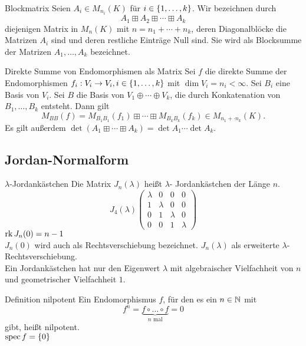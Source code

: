 \documentclass[main.tex]{subfiles}
\begin{document}
\begin{karte}{Blockmatrix}
    Seien \( A_i \in M_{n_i}(K) \) für \( i\in \{1,\ldots,k\} \). 
    Wir bezeichnen durch 
    \[ A_1 \boxplus A_2 \boxplus \cdots \boxplus A_k \] 
    diejenigen Matrix in \( M_n(K) \) mit \( n=n_1 + \cdots + n_k \), 
    deren Diagonalblöcke die Matrizen \( A_i \) sind und deren restliche 
    Einträge Null sind. Sie wird als Blocksumme der Matrizen 
    \( A_1, \ldots, A_k \) bezeichnet.
\end{karte}

\begin{karte}{Direkte Summe von Endomorphismen als Matrix}
    Sei \( f \) die direkte Summe der Endomorphismen 
    \( f_i : V_i \rightarrow V_i, i\in \{1,\ldots, k\} \) 
    mit \( \dim V_i = n_i < \infty \). Sei \( B_i \) 
    eine Basis von \( V_i \). Sei \(B\) die Basis von 
    \( V_1 \oplus \cdots \oplus V_k \), die durch 
    Konkatenation von \( B_1, \ldots, B_k \) entsteht. 
    Dann gilt 
    \[ M_{BB}(f) = M_{B_1B_1}(f_1) \boxplus \cdots \boxplus M_{B_k B_k}(f_k)
    \in M_{ n_1 + \cdot n_k }(K). \]
    Es gilt außerdem \( \det (A_1 \boxplus \cdots \boxplus A_k) = \det A_1 \cdots \det A_k \).
\end{karte}

\subsection*{Jordan-Normalform}

\begin{karte}{\(\lambda\)-Jordankästchen}
    Die Matrix \(J_n(\lambda)\) heißt \(\lambda\)- Jordankästchen der
    Länge \(n\).
    \[J_4(\lambda)\begin{pmatrix}
        \lambda &0 &0 &0\\
        1 &\lambda & 0 &0\\
        0 &1 &\lambda &0\\
        0 &0 &1 &\lambda
    \end{pmatrix}\]
    \(\operatorname{rk} J_n(0) = n-1\)\\
    \(J_n(0)\) wird auch als Rechtsverschiebung bezeichnet. \(J_n(\lambda)\)
    als erweiterte \(\lambda\)-Rechtsverschiebung.\\
    Ein Jordankästchen hat nur den Eigenwert \(\lambda\) mit algebraischer Vielfachheit
    von \(n\) und geometrischer Vielfachheit \(1\).
\end{karte}

\begin{karte}{Definition nilpotent}
    Ein Endomorphismus \(f\), für den es ein \(n \in \mathbb{N}\) mit
    \[ f^n = \underbrace{f \circ \ldots \circ f}_{n \text{ mal}} = 0 \]
    gibt, heißt nilpotent.\\
    \(\operatorname{spec} f = \{0\}\)
\end{karte}
\end{document}
